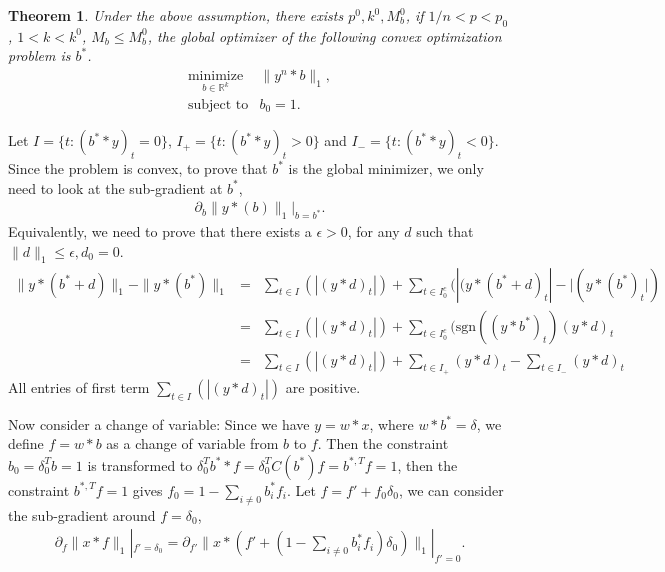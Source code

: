 \documentclass[letter, 10pt]{article}
\newtheorem{theorem}{Theorem}[section]
\numberwithin{equation}{section}
\def \endprf{\hfill {\vrule height6pt width6pt depth0pt}\medskip}
\newenvironment{proof}{\noindent {\bf Proof} }{\endprf\par}
\begin{document}
\begin{theorem}
Under the above assumption, there exists $p^0, k^0, M_b^0$, if $1/n <p< p_0$, $1<k< k^0$, $M_b\leq M_b^0$,
the global optimizer of the following convex optimization problem is $b^*$.
 \begin{eqnarray*}
\underset{b\in\mathbb{R}^k}{\mbox{minimize}}& \|y^n*b\|_1 ,\\
\mbox{subject to}& b_0 =1.
 \end{eqnarray*}
\end{theorem}
\begin{proof}
Let  $I=\{t: (b^**y)_t =0 \}$, $I_+=\{t: (b^**y)_t >0 \}$ and $I_-=\{t: (b^**y)_t <0 \}$. 
Since the problem is convex, to prove that $b^*$ is the global minimizer, we only need to look at the sub-gradient at $b^*$, 
\begin{eqnarray*}
\partial_b\|y*(b)\|_1 |_{b=b^*}.
\end{eqnarray*}
Equivalently, we need to prove that there exists a $\epsilon>0$, for any $d$ such that $\|d\|_1\leq \epsilon, d_0 =0.$   
\begin{eqnarray*}
\|y*(b^*+d)\|_1-\|y*(b^*)\|_1 
&=& \sum_{t\in I} (|(y*d)_t|) + \sum_{t\in I_0^c} (|(y*(b^*+d)_t|- |(y*(b^*)_t|) \\
&= & \sum_{t\in I} (|(y*d)_t|) +\sum_{t\in I_0^c} (\mbox{sgn}((y*b^*)_t)(y*d)_t\\
&= & \sum_{t\in I} (|(y*d)_t|) +\sum_{t\in I_+} (y*d)_t  - \sum_{t\in I_-} (y*d)_t
\end{eqnarray*}
All entries of first term $\sum_{t\in I} (|(y*d)_t|)$ are positive.

Now consider a change of variable:
Since we have $y= w*x$, where $w*b^*=\delta$, we define $f = w*b$ as a change of variable from $b$ to $f$. 
Then the constraint $b_0= \delta_0^T b = 1$ is transformed to $\delta_0^T b^* *f = \delta_0^T C(b^*)f = b^{*,T} f = 1$, then the constraint $ b^{*,T} f = 1$ gives $ f_0 = 1 - \sum_{i\neq 0} b^*_i f_i $. 
Let $f = f'+ f_0 \delta_0$, we can consider the sub-gradient around $f = \delta_0$,
\begin{eqnarray*}
\partial_f\|x*f\|_1 |_{f'=\delta_0}  = \partial_{f'}\|x*(f'+ (1 - \sum_{i\neq 0} b^*_i f_i) \delta_0)\|_1 |_{f'=0}.
\end{eqnarray*}


\end{proof}
\end{document}
